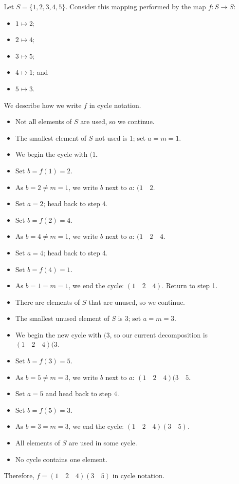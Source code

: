 \begin{example}
    Let $S = \{1,2,3,4,5\}$. Consider this mapping performed by the map $f: S \to S$:
    \begin{itemize}
        \item $1 \mapsto 2$;
        \item $2 \mapsto 4$;
        \item $3 \mapsto 5$;
        \item $4 \mapsto 1$; and
        \item $5 \mapsto 3$.
    \end{itemize}
    We describe how we write $f$ in cycle notation.
    \begin{itemize}
        \item Not all elements of $S$ are used, so we continue.
        \item The smallest element of $S$ not used is 1; set $a = m = 1$.
        \item We begin the cycle with $(1$.
        \item Set $b = f(1) = 2$.
        \item As $b = 2 \neq m = 1$, we write $b$ next to $a$: $(1\quad2$.
        \item Set $a = 2$; head back to step 4.
        \item Set $b = f(2) = 4$.
        \item As $b = 4 \neq m = 1$, we write $b$ next to $a$: $(1\quad2\quad4$.
        \item Set $a = 4$; head back to step 4.
        \item Set $b = f(4) = 1$.
        \item As $b = 1 = m = 1$, we end the cycle: $(1\quad2\quad4)$. Return to step 1.
        \item There are elements of $S$ that are unused, so we continue.
        \item The smallest unused element of $S$ is 3; set $a = m = 3$.
        \item We begin the new cycle with $(3$, so our current decomposition is $(1\quad2\quad4)(3$.
        \item Set $b = f(3) = 5$.
        \item As $b = 5 \neq m = 3$, we write $b$ next to $a$: $(1\quad2\quad4)(3\quad5$.
        \item Set $a = 5$ and head back to step 4.
        \item Set $b = f(5) = 3$.
        \item As $b = 3 = m = 3$, we end the cycle: $(1\quad2\quad4)(3\quad5)$.
        \item All elements of $S$ are used in some cycle.
        \item No cycle contains one element.
    \end{itemize}
    Therefore, $f = (1\quad2\quad4)(3\quad5)$ in cycle notation.
\end{example}

